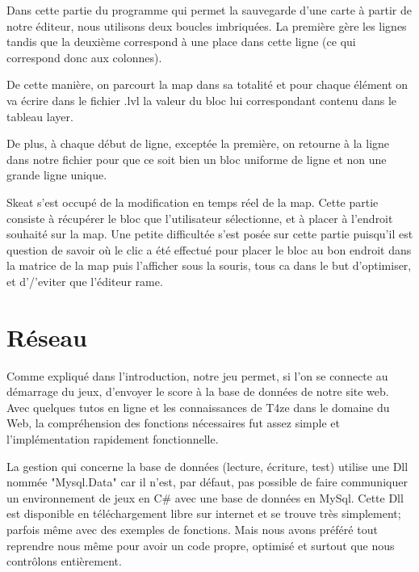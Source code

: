 \documentclass [11pt]{report}
\begin{document}
		Dans cette partie du programme qui permet la sauvegarde d'une carte à partir de  notre éditeur, nous utilisons deux boucles imbriquées. La première gère les lignes tandis que la deuxième correspond à une place dans cette ligne (ce qui correspond donc aux colonnes).
		
		De cette manière, on parcourt la map dans sa totalité et pour chaque élément on va écrire dans le fichier .lvl la valeur du bloc lui correspondant contenu dans le tableau layer. 
		
		De plus, à chaque début de ligne, exceptée la première, on retourne à la ligne dans notre fichier pour que ce soit bien un bloc uniforme de ligne et non une grande ligne unique.\\
		
		\vspace{10mm}
		
		
		 Skeat s'est occupé de la modification en temps réel de la map. Cette partie consiste à récupérer le bloc que l'utilisateur sélectionne, et \`a placer à l'endroit souhaité sur la map. Une petite difficultée s'est posée sur cette partie puisqu'il est question de savoir où le clic a été effectué pour placer le bloc au bon endroit dans la matrice de la map puis l'afficher sous la souris, tous ca dans le but d'optimiser, et d'/'eviter que l'éditeur rame.\\
			 
			
	
	
	\newpage
	
	\section{Réseau}
	Comme expliqué dans l'introduction, notre jeu permet, si l'on se connecte au démarrage du jeux, d'envoyer le score à la base de données de notre site web.\\
	
	Avec quelques tutos en ligne et les connaissances de T4ze dans le domaine du Web, la compréhension des fonctions nécessaires fut assez simple et l'implémentation rapidement fonctionnelle.
	
	La gestion qui concerne la base de données (lecture, écriture, test) utilise une Dll nommée "Mysql.Data" car il n'est, par défaut, pas possible de faire communiquer un environnement de jeux en C\# avec une base de données en MySql. Cette Dll est disponible en téléchargement libre sur internet et se trouve très simplement; parfois même avec des exemples de fonctions. Mais nous avons préféré tout reprendre nous même pour avoir un code propre, optimisé et surtout que nous contrôlons entièrement.
	
\end{document}
